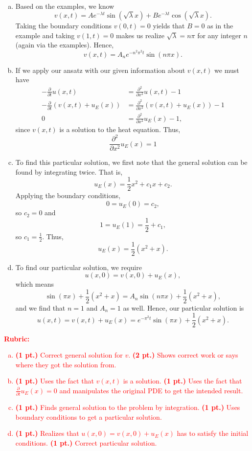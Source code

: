 \documentclass[12pt]{article} %
\begin{document}
\begin{solution}~
    \begin{enumerate}[(a)]
    \item Based on the examples, we know
    \[
    v(x,t) = Ae^{-\lambda t} \sin(\sqrt{\lambda}x)+B e^{-\lambda t} \cos(\sqrt{\lambda}x).
    \]
    Taking the boundary conditions $v(0,t)=0$ yields that $B=0$ as in the example and taking $v(1,t)=0$ makes us realize $\sqrt{\lambda} = n\pi$ for any integer $n$ (again via the examples). Hence, 
    \[
    v(x,t) = A_n e^{-n^2 \pi^2 t} \sin(n\pi x).
    \]

    \item If we apply our ansatz with our given information about $v(x,t)$ we must have
    \begin{align*}
    -\frac{\partial}{\partial t}u(x,t) &= \frac{\partial^2}{\partial x^2}u(x,t)-1\\
     -\frac{\partial}{\partial t}(v(x,t)+u_E(x)) &= \frac{\partial^2}{\partial x^2}(v(x,t)+u_E(x))-1\\
    0 &= \frac{\partial^2}{\partial x^2}u_E(x)-1,
    \end{align*}
    since $v(x,t)$ is a solution to the heat equation. Thus,
    \[
    \frac{\partial^2}{\partial x^2}u_E(x)=1
    \]

    \item To find this particular solution, we first note that the general solution can be found by integrating twice. That is,
    \[
    u_E(x) = \frac{1}{2}x^2+c_1x+c_2.
    \]
    Applying the boundary conditions,
    \[
    0=u_E(0)=c_2,
    \]
    so $c_2=0$ and
    \[
    1=u_E(1)=\frac{1}{2}+c_1,
    \]
    so $c_1=\frac{1}{2}$. Thus,
    \[
    u_E(x)=\frac{1}{2}(x^2+x).
    \]

    \item To find our particular solution, we require
    \[
    u(x,0) = v(x,0)+u_E(x),
    \]
    which means
    \[
    \sin\left(\pi x\right) + \frac{1}{2}(x^2+x)= A_n \sin(n\pi x) + \frac{1}{2}(x^2+x),
    \]
    and we find that $n=1$ and $A_n=1$ as well. Hence, our particular solution is
    \[
    u(x,t) = v(x,t)+u_E(x) = e^{-\pi^2 t}\sin\left(\pi x\right) + \frac{1}{2}(x^2+x).
    \]
\end{enumerate}
\end{solution}
\textcolor{red}{
\noindent \textbf{Rubric:}
\begin{enumerate}[(a)]
    \item \textbf{(1 pt.)} Correct general solution for $v$. \textbf{(2 pt.)} Shows correct work or says where they got the solution from.
	\item \textbf{(1 pt.)} Uses the fact that $v(x,t)$ is a solution. \textbf{(1 pt.)} Uses the fact that $\frac{\partial}{\partial t} u_E(x)=0$ and manipulates the original PDE to get the intended result.
	\item \textbf{(1 pt.)} Finds general solution to the problem by integration. \textbf{(1 pt.)} Uses boundary conditions to get a particular solution.
	\item \textbf{(1 pt.)} Realizes that $u(x,0)=v(x,0)+u_E(x)$ has to satisfy the initial conditions. \textbf{(1 pt.)} Correct particular solution.
\end{enumerate}
}
\end{document}
